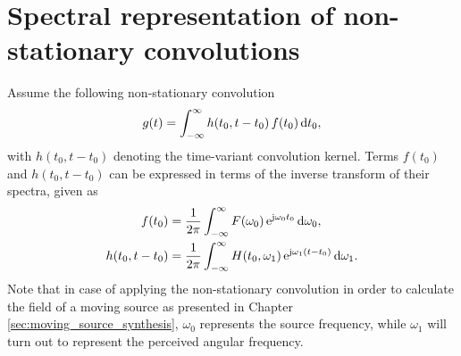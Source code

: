 \section{Spectral representation of non-stationary convolutions}
\label{Sec:Non_stat_conv}

Assume the following non-stationary convolution
\begin{equation}
g(t) = \int_{-\infty}^{\infty} h(t_0,t-t_0) \, f(t_0) \, \mathrm{d} t_0,
\label{Eq:App:Non_stat_conv_td}
\end{equation}
with $h(t_0,t-t_0)$ denoting the time-variant convolution kernel.
Terms $f(t_0)$ and $h(t_0,t-t_0)$ can be expressed in terms of the inverse transform of their spectra, given as
\begin{align}
f(t_0) &= \frac{1}{2\pi} \int_{-\infty}^{\infty} F(\omega_0) \, \mathrm{e}^{\mathrm{j} \omega_0 t_0}\, \mathrm{d} \omega_0,
\\
h(t_0,t-t_0) &= \frac{1}{2\pi}\int_{-\infty}^{\infty} H(t_0,\omega_1) \, \mathrm{e}^{\mathrm{j} \omega_1(t-t_0)} \, \mathrm{d} \omega_1.
\end{align}
Note that in case of applying the non-stationary convolution in order to calculate the field of a moving source as presented in Chapter \ref{sec:moving_source_synthesis}, $\omega_0$ represents the source frequency, while $\omega_1$ will turn out to represent the perceived angular frequency.

